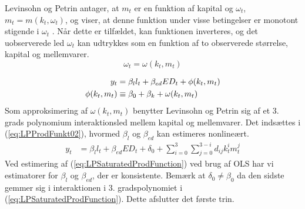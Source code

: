 Levinsohn og Petrin antager, at $m_t$ er en funktion af kapital og $\omega_t$, $m_t = m(k_t , \omega_t)$, og viser, at denne funktion under visse betingelser er monotont stigende i $\omega_t$ \cite[322-323]{levinsohn2003estimating}. Når dette er tilfældet, kan funktionen inverteres, og det uobserverede led $\omega_t$ kan udtrykkes som en funktion af to observerede størrelse, kapital og mellemvarer.
\begin{equation}
	\omega_t = \omega(k_t , m_t)
	\label{eq:InverseOmega}
\end{equation}

\begin{align}
	y_t &= \beta_l l_t + \beta_{ed} ED_t + \phi ( k_t , m_t)
	\label{eq:LPProdFunkt02}\\
	\phi ( k_t , m_t) &\equiv \beta_0 + \beta_k + \omega (k_t , m_t) \notag
\end{align}
Som approksimering af $\omega ( k_t , m_t)$ benytter Levinsohn og Petrin sig af et 3. grads polynomium interaktionsled mellem kapital og mellemvarer. Det indsættes i (\ref{eq:LPProdFunkt02}), hvormed $\beta_l$ og $\beta_{ed}$ kan estimeres nonlineært.
\begin{align}
	y_t &= \beta_l l_t + \beta_{ed} ED_t + \delta_0 + \sum_{i=0}^{3} \sum_{j=0}^{3-i} d_{ij} k_t^i m_t^j 
	\label{eq:LPSaturatedProdFunction}
\end{align}
Ved estimering af (\ref{eq:LPSaturatedProdFunction}) ved brug af OLS har vi estimatorer for $\beta_l$ og $\beta_{ed}$, der er konsistente. Bemærk at $\delta_0 \neq \beta_0$ da den sidste gemmer sig i interaktionen i 3. gradspolynomiet i (\ref{eq:LPSaturatedProdFunction}). Dette afslutter det første trin.

